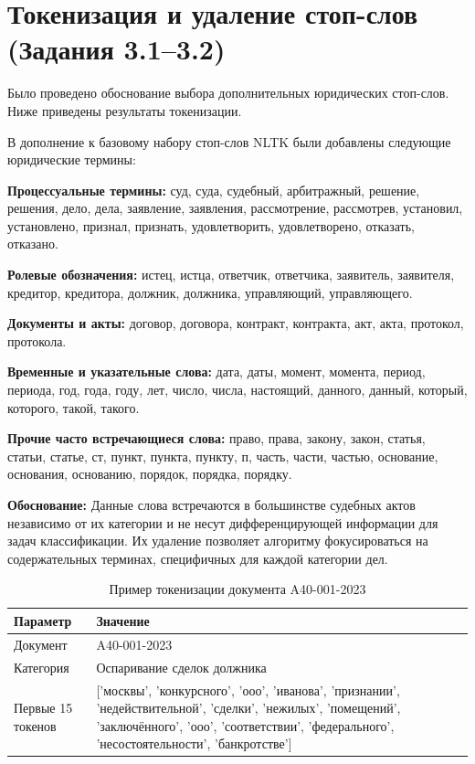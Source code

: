 \documentclass[12pt, a4paper]{report}
\begin{document}
\section{Токенизация и удаление стоп-слов (Задания 3.1–3.2)}

Было проведено обоснование выбора дополнительных юридических стоп-слов. Ниже приведены результаты токенизации.

\begin{tcolorbox}[infobox, title={Дополнительные юридические стоп-слова}]
В дополнение к базовому набору стоп-слов NLTK были добавлены следующие юридические термины:

\textbf{Процессуальные термины:} суд, суда, судебный, арбитражный, решение, решения, дело, дела, заявление, заявления, рассмотрение, рассмотрев, установил, установлено, признал, признать, удовлетворить, удовлетворено, отказать, отказано.

\textbf{Ролевые обозначения:} истец, истца, ответчик, ответчика, заявитель, заявителя, кредитор, кредитора, должник, должника, управляющий, управляющего.

\textbf{Документы и акты:} договор, договора, контракт, контракта, акт, акта, протокол, протокола.

\textbf{Временные и указательные слова:} дата, даты, момент, момента, период, периода, год, года, году, лет, число, числа, настоящий, данного, данный, который, которого, такой, такого.

\textbf{Прочие часто встречающиеся слова:} право, права, закону, закон, статья, статьи, статье, ст, пункт, пункта, пункту, п, часть, части, частью, основание, основания, основанию, порядок, порядка, порядку.

\textbf{Обоснование:} Данные слова встречаются в большинстве судебных актов независимо от их категории и не несут дифференцирующей информации для задач классификации. Их удаление позволяет алгоритму фокусироваться на содержательных терминах, специфичных для каждой категории дел.
\end{tcolorbox}

\begin{table}[h]
  \centering
  \caption{Пример токенизации документа A40-001-2023}
  \label{tab:tokenization_example}
  \begin{tabularx}{\textwidth}{@{}l X@{}}
    \toprule
    \rowcolor{LightBlue}
    \textsf{\textbf{Параметр}} & \textsf{\textbf{Значение}} \\
    \midrule
    Документ & A40-001-2023 \\
    Категория & Оспаривание сделок должника \\
    Первые 15 токенов & ['москвы', 'конкурсного', 'ооо', 'иванова', 'признании', 'недействительной', 'сделки', 'нежилых', 'помещений', 'заключённого', 'ооо', 'соответствии', 'федерального', 'несостоятельности', 'банкротстве'] \\
    \bottomrule
  \end{tabularx}
\end{table}
\end{document}
